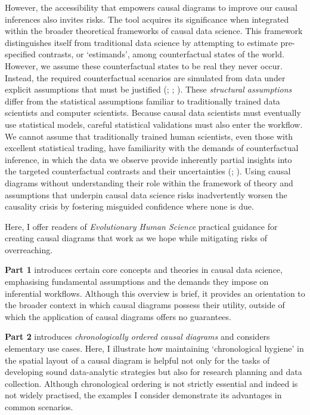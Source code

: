 \documentclass[
  singlecolumn,
  9pt]{article}
\begin{document}
However, the accessibility that empowers causal diagrams to improve our
causal inferences also invites risks. The tool acquires its significance
when integrated within the broader theoretical frameworks of causal data
science. This framework distinguishes itself from traditional data
science by attempting to estimate pre-specified contrasts, or
`estimands', among counterfactual states of the world. However, we
assume these counterfactual states to be real they never occur. Instead,
the required counterfactual scenarios are simulated from data under
explicit assumptions that must be justified
(;
;
). These
\emph{structural assumptions} differ from the statistical assumptions
familiar to traditionally trained data scientists and computer
scientists. Because causal data scientists must eventually use
statistical models, careful statistical validations must also enter the
workflow. We cannot assume that traditionally trained human scientists,
even those with excellent statistical trading, have familiarity with the
demands of counterfactual inference, in which the data we observe
provide inherently partial insights into the targeted counterfactual
contrasts and their uncertainties (; ). Using
causal diagrams without understanding their role within the framework of
theory and assumptions that underpin causal data science risks
inadvertently worsen the causality crisis by fostering misguided
confidence where none is due.

Here, I offer readers of \emph{Evolutionary Human Science} practical
guidance for creating causal diagrams that work as we hope while
mitigating risks of overreaching.

\textbf{Part 1} introduces certain core concepts and theories in causal
data science, emphasising fundamental assumptions and the demands they
impose on inferential workflows. Although this overview is brief, it
provides an orientation to the broader context in which causal diagrams
possess their utility, outside of which the application of causal
diagrams offers no guarantees.

\textbf{Part 2} introduces \emph{chronologically ordered causal
diagrams} and considers elementary use cases. Here, I illustrate how
maintaining `chronological hygiene' in the spatial layout of a causal
diagram is helpful not only for the tasks of developing sound
data-analytic strategies but also for research planning and data
collection. Although chronological ordering is not strictly essential
and indeed is not widely practised, the examples I consider demonstrate
its advantages in common scenarios.
\end{document}
